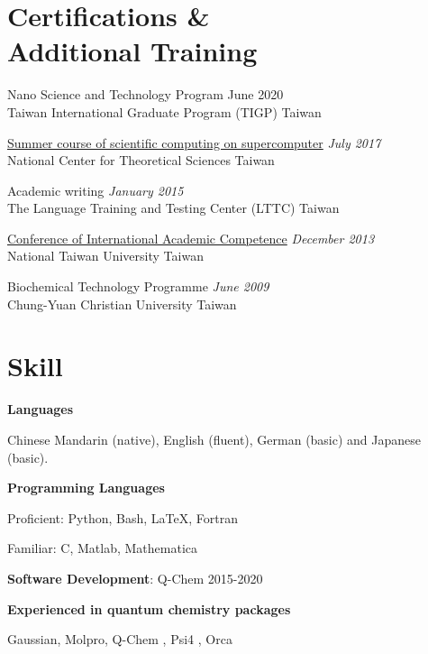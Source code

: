 \section{\sc Certifications \& \\ Additional Training }


    Nano Science and Technology Program \hfill {June 2020}\\
    Taiwan International Graduate Program (TIGP) \hfill Taiwan


 \href{http://nkl.cc.u-tokyo.ac.jp/NTU2017S/}{Summer course of scientific computing on supercomputer} \hfill \textit{July 2017}\\
    National Center for Theoretical Sciences \hfill Taiwan 
    
Academic writing \hfill \textit{January 2015}\\
    The Language Training and Testing Center (LTTC) \hfill Taiwan

    \href{http://iac2013.weebly.com}{Conference of International Academic Competence}
    \hfill \textit{December 2013}\\
    National Taiwan University \hfill Taiwan

    Biochemical Technology Programme \hfill \textit{June 2009}\\
    Chung-Yuan Christian University \hfill Taiwan


    \section{\sc Skill}

    {\bf Languages}
    \begin{list1}
        \item[]Chinese Mandarin (native), English (fluent), German (basic) and Japanese (basic).
    \end{list1}
    
    {\bf Programming Languages}
    \begin{list1}
        \item[] Proficient: Python, Bash, \LaTeX, Fortran
        \item[] Familiar: C, Matlab, Mathematica
    \end{list1}
    
    
    {\bf Software Development}: Q-Chem \hfill 2015-2020 
    
    {\bf Experienced in quantum chemistry packages}
    \begin{list1}
        \item[] Gaussian, Molpro, Q-Chem , Psi4 , Orca
    \end{list1}
\endinput